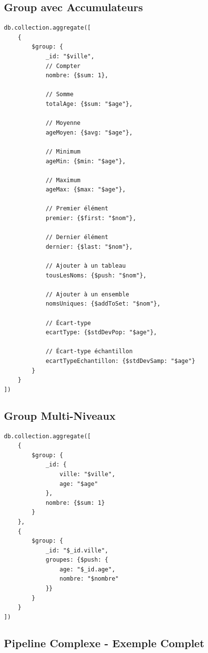 \documentclass[11pt,a4paper]{article}
\begin{document}
\subsection{Group avec Accumulateurs}

\begin{lstlisting}
db.collection.aggregate([
    {
        $group: {
            _id: "$ville",
            // Compter
            nombre: {$sum: 1},
            
            // Somme
            totalAge: {$sum: "$age"},
            
            // Moyenne
            ageMoyen: {$avg: "$age"},
            
            // Minimum
            ageMin: {$min: "$age"},
            
            // Maximum
            ageMax: {$max: "$age"},
            
            // Premier élément
            premier: {$first: "$nom"},
            
            // Dernier élément
            dernier: {$last: "$nom"},
            
            // Ajouter à un tableau
            tousLesNoms: {$push: "$nom"},
            
            // Ajouter à un ensemble
            nomsUniques: {$addToSet: "$nom"},
            
            // Écart-type
            ecartType: {$stdDevPop: "$age"},
            
            // Écart-type échantillon
            ecartTypeEchantillon: {$stdDevSamp: "$age"}
        }
    }
])
\end{lstlisting}

\subsection{Group Multi-Niveaux}

\begin{lstlisting}
db.collection.aggregate([
    {
        $group: {
            _id: {
                ville: "$ville",
                age: "$age"
            },
            nombre: {$sum: 1}
        }
    },
    {
        $group: {
            _id: "$_id.ville",
            groupes: {$push: {
                age: "$_id.age",
                nombre: "$nombre"
            }}
        }
    }
])
\end{lstlisting}

\subsection{Pipeline Complexe - Exemple Complet}
\end{document}
